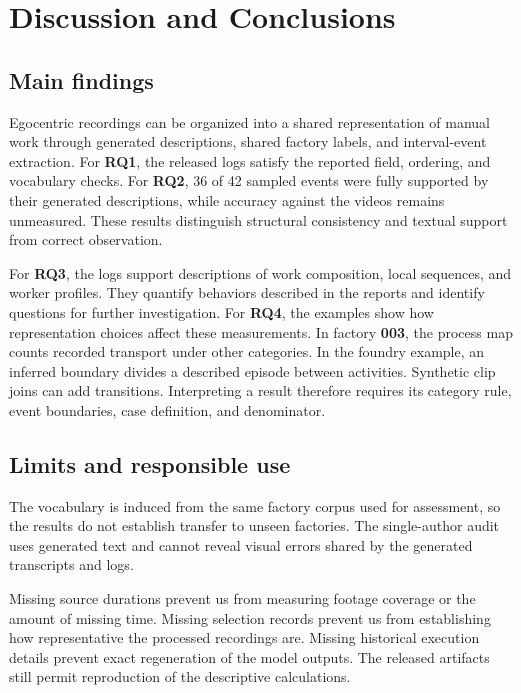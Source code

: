 \section{Discussion and Conclusions}
\label{sec:discussion}
\subsection{Main findings}
\label{sec:representation_findings}
Egocentric recordings can be organized into a shared representation of manual work through generated descriptions, shared factory labels, and interval-event extraction. For \textbf{RQ1}, the released logs satisfy the reported field, ordering, and vocabulary checks. For \textbf{RQ2}, 36 of 42 sampled events were fully supported by their generated descriptions, while accuracy against the videos remains unmeasured. These results distinguish structural consistency and textual support from correct observation.

For \textbf{RQ3}, the logs support descriptions of work composition, local sequences, and worker profiles. They quantify behaviors described in the reports and identify questions for further investigation. For \textbf{RQ4}, the examples show how representation choices affect these measurements. In factory \textbf{003}, the process map counts recorded transport under other categories. In the foundry example, an inferred boundary divides a described episode between activities. Synthetic clip joins can add transitions. Interpreting a result therefore requires its category rule, event boundaries, case definition, and denominator.

\subsection{Limits and responsible use}
\label{sec:limits}
The vocabulary is induced from the same factory corpus used for assessment, so the results do not establish transfer to unseen factories. The single-author audit uses generated text and cannot reveal visual errors shared by the generated transcripts and logs.

Missing source durations prevent us from measuring footage coverage or the amount of missing time. Missing selection records prevent us from establishing how representative the processed recordings are. Missing historical execution details prevent exact regeneration of the model outputs. The released artifacts still permit reproduction of the descriptive calculations.

